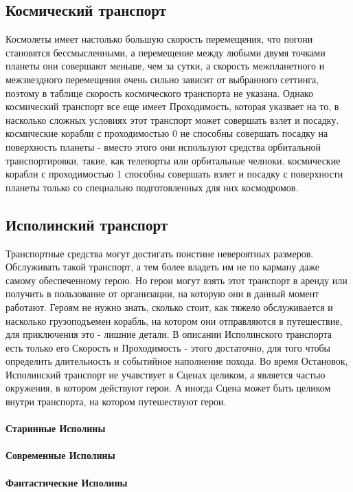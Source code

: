 \subsection{Космический транспорт}
Космолеты имеет настолько большую скорость перемещения, что погони становятся бессмысленными, а перемещение между любыми двумя точками планеты они совершают меньше, чем за сутки, а скорость межпланетного и межзвездного перемещения очень сильно зависит от выбранного сеттинга, поэтому в таблице скорость космического транспорта не указана. Однако космический транспорт все еще имеет Проходимость, которая указвает на то, в насколько сложных условиях этот транспорт может совершать взлет и посадку.
\newline космические корабли с проходимостью 0 не способны совершать посадку на поверхность планеты - вместо этого они используют средства орбитальной транспортировки, такие, как телепорты или орбитальные челноки.
\newline космические корабли с проходимостью 1 способны совершать взлет и посадку с поверхности планеты только со специально подготовленных для них космодромов.

\subsection{Исполинский транспорт}
Транспортные средства могут достигать поистине невероятных размеров. Обслуживать такой транспорт, а тем более владеть им не по карману даже самому обеспеченному герою. Но герои могут взять этот транспорт в аренду или получить в пользование от организации, на которую они в данный момент работают.
\newline Героям не нужно знать, сколько стоит, как тяжело обслуживается и насколько грузоподъемен корабль, на котором они отправляются в путешествие, для приключения это - лишние детали. В описании Исполинского транспорта есть только его Скорость и Проходимость - этого достаточно, для того чтобы определить длительность и событийное наполнение похода.
\newline Во время Остановок, Исполинский транспорт не учавствует в Сценах целиком, а является частью окружения, в котором действуют герои. А иногда Сцена может быть целиком внутри транспорта, на котором путешествуют герои.
\paragraph{Старинные Исполины}
\paragraph{Современные Исполины}
\paragraph{Фантастические Исполины}
